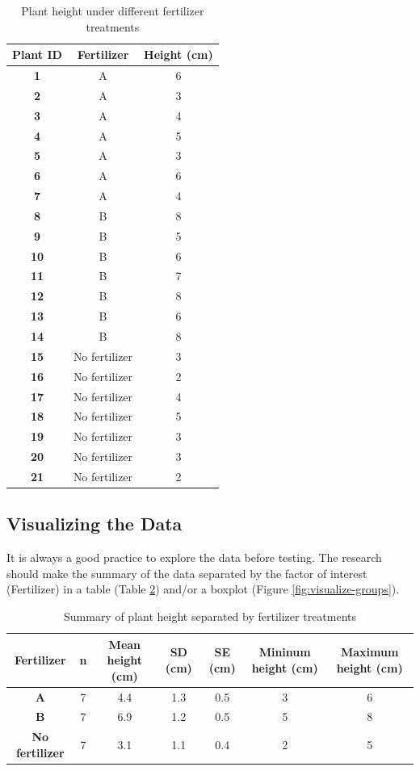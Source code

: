 \documentclass[
]{book}
\begin{document}
\begin{table}
\centering
\caption{\label{tab:plant-data-tab}Plant height under different fertilizer treatments}
\centering
\begin{tabular}[t]{>{}c|c|c}
\hline
Plant ID & Fertilizer & Height (cm)\\
\hline
\textbf{1} & A & 6\\
\hline
\textbf{2} & A & 3\\
\hline
\textbf{3} & A & 4\\
\hline
\textbf{4} & A & 5\\
\hline
\textbf{5} & A & 3\\
\hline
\textbf{6} & A & 6\\
\hline
\textbf{7} & A & 4\\
\hline
\textbf{8} & B & 8\\
\hline
\textbf{9} & B & 5\\
\hline
\textbf{10} & B & 6\\
\hline
\textbf{11} & B & 7\\
\hline
\textbf{12} & B & 8\\
\hline
\textbf{13} & B & 6\\
\hline
\textbf{14} & B & 8\\
\hline
\textbf{15} & No fertilizer & 3\\
\hline
\textbf{16} & No fertilizer & 2\\
\hline
\textbf{17} & No fertilizer & 4\\
\hline
\textbf{18} & No fertilizer & 5\\
\hline
\textbf{19} & No fertilizer & 3\\
\hline
\textbf{20} & No fertilizer & 3\\
\hline
\textbf{21} & No fertilizer & 2\\
\hline
\end{tabular}
\end{table}

\subsection{Visualizing the Data}\label{visualizing-the-data}

It is always a good practice to explore the data before testing. The research should make the summary of the data separated by the factor of interest (Fertilizer) in a table (Table \ref{tab:summary-data}) and/or a boxplot (Figure \ref{fig:visualize-groups}).

\begin{table}
\centering
\caption{\label{tab:summary-data}Summary of plant height separated by fertilizer treatments}
\centering
\begin{tabular}[t]{>{}c|c|c|c|c|c|c}
\hline
Fertilizer & n & Mean height (cm) & SD (cm) & SE (cm) & Mininum height (cm) & Maximum height (cm)\\
\hline
\textbf{A} & 7 & 4.4 & 1.3 & 0.5 & 3 & 6\\
\hline
\textbf{B} & 7 & 6.9 & 1.2 & 0.5 & 5 & 8\\
\hline
\textbf{No fertilizer} & 7 & 3.1 & 1.1 & 0.4 & 2 & 5\\
\hline
\end{tabular}
\end{table}
\end{document}

